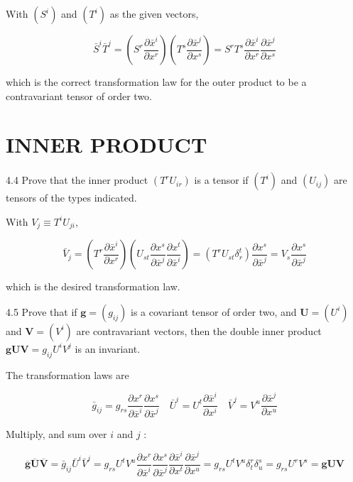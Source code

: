 \documentclass[10pt]{article}
\begin{document}
With $\left(S^{i}\right)$ and $\left(T^{i}\right)$ as the given vectors,

$$
\bar{S}^{i} \bar{T}^{j}=\left(S^{r} \frac{\partial \bar{x}^{i}}{\partial x^{r}}\right)\left(T^{s} \frac{\partial \bar{x}^{j}}{\partial x^{s}}\right)=S^{r} T^{s} \frac{\partial \bar{x}^{i}}{\partial x^{r}} \frac{\partial \bar{x}^{j}}{\partial x^{s}}
$$

which is the correct transformation law for the outer product to be a contravariant tensor of order two.

\section*{INNER PRODUCT}
4.4 Prove that the inner product $\left(T^{r} U_{i r}\right)$ is a tensor if $\left(T^{i}\right)$ and $\left(U_{i j}\right)$ are tensors of the types indicated.

With $V_{j} \equiv T^{i} U_{j i}$,

$$
\bar{V}_{j}=\left(T^{r} \frac{\partial \bar{x}^{i}}{\partial x^{r}}\right)\left(U_{s t} \frac{\partial x^{s}}{\partial \bar{x}^{j}} \frac{\partial x^{t}}{\partial \bar{x}^{i}}\right)=\left(T^{r} U_{s t} \delta_{r}^{t}\right) \frac{\partial x^{s}}{\partial \bar{x}^{j}}=V_{s} \frac{\partial x^{s}}{\partial \bar{x}^{j}}
$$

which is the desired transformation law.

4.5 Prove that if $\mathbf{g}=\left(g_{i j}\right)$ is a covariant tensor of order two, and $\mathbf{U}=\left(U^{i}\right)$ and $\mathbf{V}=\left(V^{i}\right)$ are contravariant vectors, then the double inner product $\mathbf{g U V}=g_{i j} U^{i} V^{j}$ is an invariant.

The transformation laws are

$$
\bar{g}_{i j}=g_{r s} \frac{\partial x^{r}}{\partial \bar{x}^{i}} \frac{\partial x^{s}}{\partial \bar{x}^{j}} \quad \bar{U}^{i}=U^{t} \frac{\partial \bar{x}^{i}}{\partial x^{i}} \quad \bar{V}^{j}=V^{u} \frac{\partial \bar{x}^{j}}{\partial x^{u}}
$$

Multiply, and sum over $i$ and $j$ :

$$
\overline{\mathbf{g}} \overline{\mathbf{U}} \overline{\mathbf{V}}=\bar{g}_{i j} \bar{U}^{i} \bar{V}^{j}=g_{r s} U^{t} V^{u} \frac{\partial x^{r}}{\partial \bar{x}^{i}} \frac{\partial x^{s}}{\partial \bar{x}^{j}} \frac{\partial \bar{x}^{i}}{\partial x^{t}} \frac{\partial \bar{x}^{j}}{\partial x^{u}}=g_{r s} U^{t} V^{u} \delta_{t}^{r} \delta_{u}^{s}=g_{r s} U^{r} V^{s}=\mathbf{g} \mathbf{U} \mathbf{V}
$$
\end{document}

